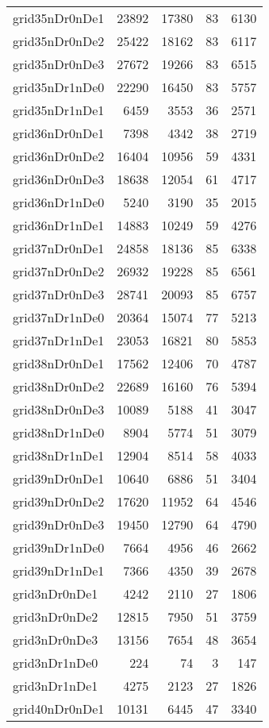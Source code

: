 \begin{longtable}{lrrrr}
grid35nDr0nDe1 & 23892 & 17380 & 83 & 6130 \\
grid35nDr0nDe2 & 25422 & 18162 & 83 & 6117 \\
grid35nDr0nDe3 & 27672 & 19266 & 83 & 6515 \\
grid35nDr1nDe0 & 22290 & 16450 & 83 & 5757 \\
grid35nDr1nDe1 & 6459 & 3553 & 36 & 2571 \\
grid36nDr0nDe1 & 7398 & 4342 & 38 & 2719 \\
grid36nDr0nDe2 & 16404 & 10956 & 59 & 4331 \\
grid36nDr0nDe3 & 18638 & 12054 & 61 & 4717 \\
grid36nDr1nDe0 & 5240 & 3190 & 35 & 2015 \\
grid36nDr1nDe1 & 14883 & 10249 & 59 & 4276 \\
grid37nDr0nDe1 & 24858 & 18136 & 85 & 6338 \\
grid37nDr0nDe2 & 26932 & 19228 & 85 & 6561 \\
grid37nDr0nDe3 & 28741 & 20093 & 85 & 6757 \\
grid37nDr1nDe0 & 20364 & 15074 & 77 & 5213 \\
grid37nDr1nDe1 & 23053 & 16821 & 80 & 5853 \\
grid38nDr0nDe1 & 17562 & 12406 & 70 & 4787 \\
grid38nDr0nDe2 & 22689 & 16160 & 76 & 5394 \\
grid38nDr0nDe3 & 10089 & 5188 & 41 & 3047 \\
grid38nDr1nDe0 & 8904 & 5774 & 51 & 3079 \\
grid38nDr1nDe1 & 12904 & 8514 & 58 & 4033 \\
grid39nDr0nDe1 & 10640 & 6886 & 51 & 3404 \\
grid39nDr0nDe2 & 17620 & 11952 & 64 & 4546 \\
grid39nDr0nDe3 & 19450 & 12790 & 64 & 4790 \\
grid39nDr1nDe0 & 7664 & 4956 & 46 & 2662 \\
grid39nDr1nDe1 & 7366 & 4350 & 39 & 2678 \\
grid3nDr0nDe1 & 4242 & 2110 & 27 & 1806 \\
grid3nDr0nDe2 & 12815 & 7950 & 51 & 3759 \\
grid3nDr0nDe3 & 13156 & 7654 & 48 & 3654 \\
grid3nDr1nDe0 & 224 & 74 & 3 & 147 \\
grid3nDr1nDe1 & 4275 & 2123 & 27 & 1826 \\
grid40nDr0nDe1 & 10131 & 6445 & 47 & 3340 \\

\end{longtable}
